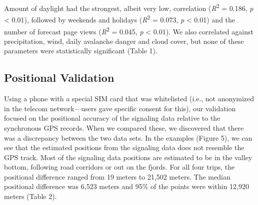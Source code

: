 \documentclass[authordate,empirical, issue]{jote-new-article}
\begin{document}
Amount of daylight had the strongest, albeit very low, correlation (\emph{R}\textsuperscript{2} = 0.186, \emph{p} < 0.01), followed by weekends and holidays (\emph{R}\textsuperscript{2} = 0.073, \emph{p} < 0.01) and the number of forecast page views (\emph{R}\textsuperscript{2} = 0.045, \emph{p} < 0.01). We also correlated against precipitation, wind, daily avalanche danger and cloud cover, but none of these parameters were statistically significant (Table 1).













\subsection{Positional Validation}



Using a phone with a special SIM card that was whitelisted (i.e., not anonymized in the telecom network—users gave specific consent for this), our validation focused on the positional accuracy of the signaling data relative to the synchronous GPS records. When we compared these, we discovered that there was a discrepancy between the two data sets. In the examples (Figure 5), we can see that the estimated positions from the signaling data does not resemble the GPS track. Most of the signaling data positions are estimated to be in the valley bottom, following road corridors or out on the fjords. For all four trips, the positional difference ranged from 19 meters to 21,502 meters. The median positional difference was 6,523 meters and 95\% of the points were within 12,920 meters (Table 2).
\end{document}
